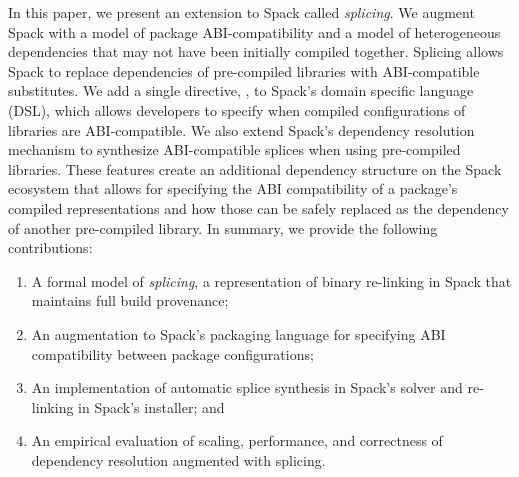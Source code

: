 In this paper, we present an extension to Spack called \emph{splicing}.
We augment Spack with a model of package ABI-compatibility and a model of
heterogeneous dependencies that may not have been initially compiled together.
Splicing allows Spack to replace dependencies of pre-compiled libraries
with ABI-compatible substitutes. We add a single directive,
, to Spack's domain specific language (DSL), which allows
developers to specify when compiled configurations of libraries are ABI-compatible.
We also extend Spack's dependency resolution mechanism to synthesize
ABI-compatible splices when using pre-compiled libraries. These features create
an additional dependency structure on the Spack ecosystem that allows for
specifying the ABI compatibility of a package's compiled representations and how
those can be safely replaced as the dependency of another pre-compiled
library.
%
In summary, we provide the following contributions:
\begin{enumerate}
\item A formal model of \textit{splicing}, a representation of binary
  re-linking in Spack that maintains full build provenance;

\item An augmentation to Spack's packaging language for specifying ABI
  compatibility between package configurations;

\item An implementation of automatic splice synthesis in Spack's
  solver and re-linking in Spack's installer; and

\item An empirical evaluation of scaling, performance, and correctness of
  dependency resolution augmented with splicing.
\end{enumerate}

